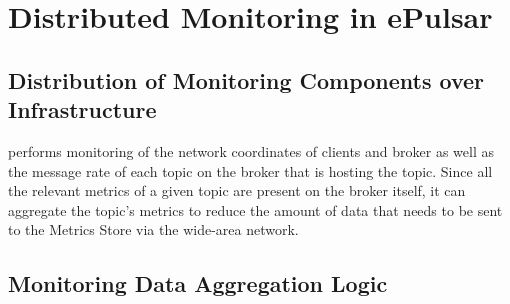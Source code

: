 \section{Distributed Monitoring in ePulsar}
\subsection{Distribution of Monitoring Components over Infrastructure}
\epulsar{} performs monitoring of the network coordinates of clients and broker as well as the message rate of each topic on the broker that is hosting the topic. Since all the relevant metrics of a given topic are present on the broker itself, it can aggregate the topic's metrics to reduce the amount of data that needs to be sent to the Metrics Store via the wide-area network.

\subsection{Monitoring Data Aggregation Logic}

